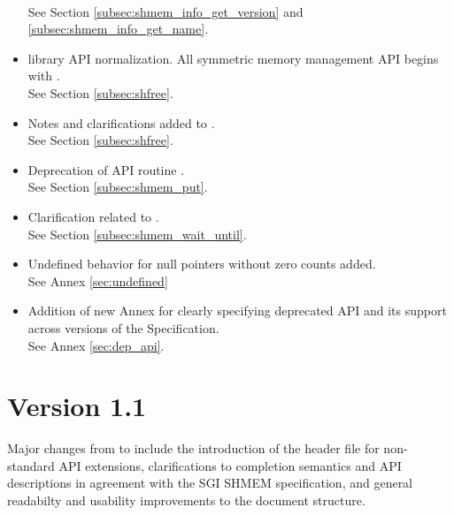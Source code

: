 \begin{itemize}
\\See Section \ref{subsec:shmem_info_get_version} and \ref{subsec:shmem_info_get_name}.
%
\item \openshmem library API normalization. All \Cstd symmetric memory management
      API begins with  .
\\See Section \ref{subsec:shfree}.
%
\item Notes and clarifications added to .
\\See Section \ref{subsec:shfree}.
%
\item Deprecation of \Fortran API routine .
\\See Section \ref{subsec:shmem_put}. 
%
\item Clarification related to .
\\See Section \ref{subsec:shmem_wait_until}.
%
\item Undefined behavior for null pointers without zero counts added.
\\See Annex \ref{sec:undefined}
%
\item Addition of new Annex for clearly specifying deprecated API and its
      support across versions of the \openshmem Specification.
\\See Annex \ref{sec:dep_api}.
%
\end{itemize}




\section{Version 1.1}
Major changes from \openshmem[1.0] to \openshmem[1.1] include
the introduction of the  header file for non-standard API
extensions,
clarifications to completion semantics and API descriptions in agreement with
the \ac{SGI} SHMEM specification,
and general readabilty and usability improvements to the document structure.

